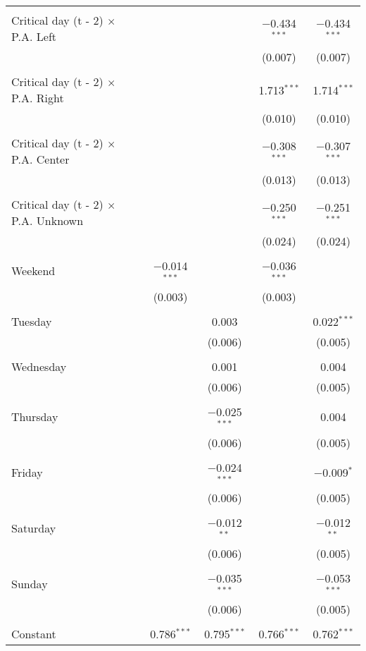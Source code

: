 \documentclass[
]{article}
\begin{document}
\begin{table}[!htbp]
{\begin{tabular}{@{\extracolsep{5pt}}lcccc}
  & & & & \\ 
 Critical day (t - 2) $\times$ P.A. Left &  &  & $-$0.434$^{***}$ & $-$0.434$^{***}$ \\ 
  &  &  & (0.007) & (0.007) \\ 
  & & & & \\ 
 Critical day (t - 2) $\times$ P.A. Right &  &  & 1.713$^{***}$ & 1.714$^{***}$ \\ 
  &  &  & (0.010) & (0.010) \\ 
  & & & & \\ 
 Critical day (t - 2) $\times$ P.A. Center &  &  & $-$0.308$^{***}$ & $-$0.307$^{***}$ \\ 
  &  &  & (0.013) & (0.013) \\ 
  & & & & \\ 
 Critical day (t - 2) $\times$ P.A. Unknown &  &  & $-$0.250$^{***}$ & $-$0.251$^{***}$ \\ 
  &  &  & (0.024) & (0.024) \\ 
  & & & & \\ 
 Weekend & $-$0.014$^{***}$ &  & $-$0.036$^{***}$ &  \\ 
  & (0.003) &  & (0.003) &  \\ 
  & & & & \\ 
 Tuesday &  & 0.003 &  & 0.022$^{***}$ \\ 
  &  & (0.006) &  & (0.005) \\ 
  & & & & \\ 
 Wednesday &  & 0.001 &  & 0.004 \\ 
  &  & (0.006) &  & (0.005) \\ 
  & & & & \\ 
 Thursday &  & $-$0.025$^{***}$ &  & 0.004 \\ 
  &  & (0.006) &  & (0.005) \\ 
  & & & & \\ 
 Friday &  & $-$0.024$^{***}$ &  & $-$0.009$^{*}$ \\ 
  &  & (0.006) &  & (0.005) \\ 
  & & & & \\ 
 Saturday &  & $-$0.012$^{**}$ &  & $-$0.012$^{**}$ \\ 
  &  & (0.006) &  & (0.005) \\ 
  & & & & \\ 
 Sunday &  & $-$0.035$^{***}$ &  & $-$0.053$^{***}$ \\ 
  &  & (0.006) &  & (0.005) \\ 
  & & & & \\ 
 Constant & 0.786$^{***}$ & 0.795$^{***}$ & 0.766$^{***}$ & 0.762$^{***}$ \\ 

\end{tabular}}
\end{table}
\end{document}
